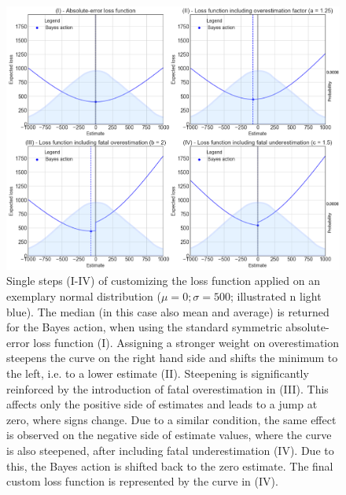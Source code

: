 		\begin{figure}[p!]
			\centering
			\includegraphics[width=1\textwidth]{Figures/LF_4steps_normal2.png}
			\caption{Single steps (I-IV) of customizing the loss function applied on an exemplary normal distribution ($\mu=0; \sigma=500$; illustrated n light blue). The median (in this case also mean and average) is returned for the Bayes action, when using the standard symmetric absolute-error loss function (I). Assigning a stronger weight on overestimation steepens the curve on the right hand side and shifts the minimum to the left, i.e. to a lower estimate (II). Steepening is significantly reinforced by the introduction of fatal overestimation in (III). This affects only the positive side of estimates and leads to a jump at zero, where signs change. Due to a similar condition, the same effect is observed on the negative side of estimate values, where the curve is also steepened, after including fatal underestimation (IV). Due to this, the Bayes action is shifted back to the zero estimate. The final custom loss function is represented by the curve in (IV).}\label{fig:LF_4steps_normal}
			\centering
		\end{figure}		
